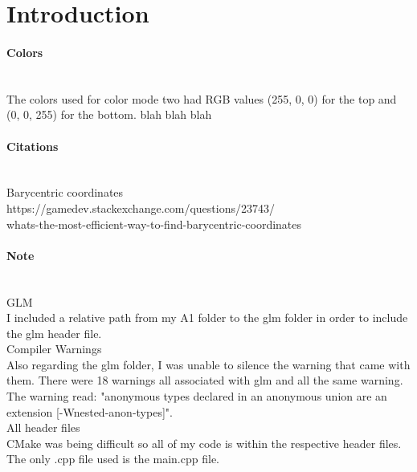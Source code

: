\documentclass[12pt]{article}
\begin{document}
\maketitle

\section{Introduction}
\paragraph{Colors}\mbox{} \vspace{1.0em}
\\
The colors used for color mode two had RGB values (255, 0, 0) for the top and (0, 0, 255) for the bottom. blah blah blah

\paragraph{Citations}  \mbox{} \vspace{1.0em}
\\
Barycentric coordinates
\\
https://gamedev.stackexchange.com/questions/23743/ \\
whats-the-most-efficient-way-to-find-barycentric-coordinates

\paragraph{Note} \mbox{} \vspace{1.0em}
\\
GLM
\\
I included a relative path from my A1 folder to the glm folder in order to include the glm header file.
\vspace{.5em}
\\ 
Compiler Warnings
\\
Also regarding the glm folder, I was unable to silence the warning that came with them. There were 18 warnings
all associated with glm and all the same warning. The warning read: "anonymous types declared in an anonymous union are an extension [-Wnested-anon-types]".
\vspace{.5em}
\\ 
All header files
\\
CMake was being difficult so all of my code is within the respective header files. The only .cpp file used is the main.cpp file.
\end{document}
